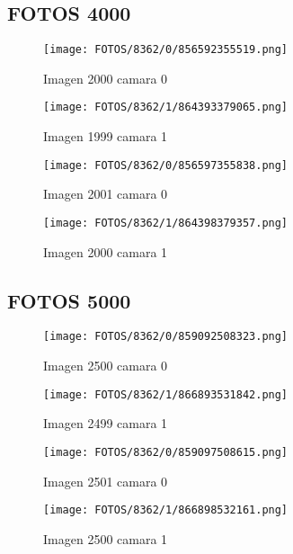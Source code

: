 \documentclass{article}
\begin{document}
\subsection{FOTOS 4000}

\begin{figure}[H]
  \centering
  \begin{minipage}[b]{0.45\textwidth}
    \centering
    \texttt{[image: FOTOS/8362/0/856592355519.png]}
    \caption{Imagen 2000 camara 0}
  \end{minipage}
  \begin{minipage}[b]{0.45\textwidth}
    \centering
    \texttt{[image: FOTOS/8362/1/864393379065.png]}
    \caption{Imagen 1999 camara 1}
  \end{minipage}
  \begin{minipage}[b]{0.45\textwidth}
    \centering
    \texttt{[image: FOTOS/8362/0/856597355838.png]}
    \caption{Imagen 2001 camara 0}
  \end{minipage}
  \begin{minipage}[b]{0.45\textwidth}
    \centering
    \texttt{[image: FOTOS/8362/1/864398379357.png]}
    \caption{Imagen 2000 camara 1}
  \end{minipage}
\end{figure}

\subsection{FOTOS 5000}

\begin{figure}[H]
  \centering
  \begin{minipage}[b]{0.45\textwidth}
    \centering
    \texttt{[image: FOTOS/8362/0/859092508323.png]}
    \caption{Imagen 2500 camara 0}
  \end{minipage}
  \begin{minipage}[b]{0.45\textwidth}
    \centering
    \texttt{[image: FOTOS/8362/1/866893531842.png]}
    \caption{Imagen 2499 camara 1}
  \end{minipage}
  \begin{minipage}[b]{0.45\textwidth}
    \centering
    \texttt{[image: FOTOS/8362/0/859097508615.png]}
    \caption{Imagen 2501 camara 0}
  \end{minipage}
  \begin{minipage}[b]{0.45\textwidth}
    \centering
    \texttt{[image: FOTOS/8362/1/866898532161.png]}
    \caption{Imagen 2500 camara 1}
  \end{minipage}
\end{figure}
\end{document}
